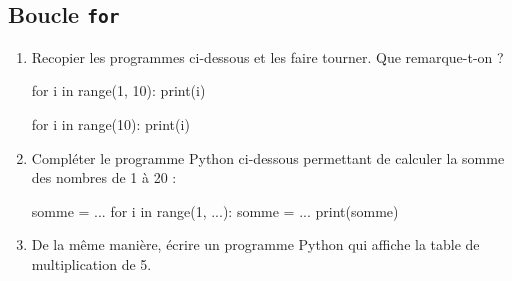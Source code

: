 \documentclass[12pt,a4paper, oneside]{article}
\theoremstyle{definition}
\begin{document}
   \subsection{Boucle \texttt{for}}\label{subsec:boucle-texttt-for}
   \begin{enumerate}
      \item Recopier les programmes ci-dessous et les faire tourner.
      Que remarque-t-on ?

      \begin{minipage}{.4\textwidth}
        \begin{pyverbatim}
      for i in range(1, 10):
         print(i)
        \end{pyverbatim}
        \end{minipage}
      \begin{minipage}{.4\textwidth}
         \begin{pyverbatim}
      for i in range(10):
         print(i)
         \end{pyverbatim}
        \end{minipage}

      \newpage

      \item Compléter le programme Python ci-dessous permettant de calculer la somme des nombres de 1 à 20 :
         \begin{pyverbatim}
           somme = ...
           for i in range(1, ...):
             somme = ...
           print(somme)
        \end{pyverbatim}
      \item De la même manière, écrire un programme Python qui affiche la table de multiplication de 5.
   \end{enumerate}
\end{document}

